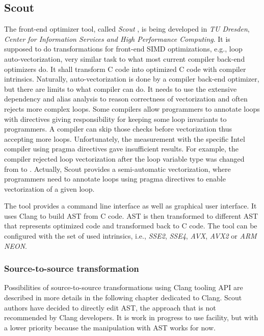 \subsection{Scout}
\label{scout}
The front-end optimizer tool, called \emph{Scout} \cite{scout}, is being developed in \emph{TU Dresden}, \emph{Center for Information Services and High Performance Computing}. It is supposed to do transformations for front-end SIMD optimizations, e.g., loop auto-vectorization, very similar task to what most current compiler back-end optimizers do. It shall transform C code into optimized C code with compiler intrinsics. Naturally, auto-vectorization is done by a compiler back-end optimizer, but there are limits to what compiler can do. It needs to use the extensive dependency and alias analysis to reason correctness of vectorization and often rejects more complex loops. Some compilers allow programmers to annotate loops with  directives giving responsibility for keeping some loop invariants to programmers. A compiler can skip those checks before vectorization thus accepting more loops. Unfortunately, the measurement with the specific Intel compiler using pragma directives gave insufficient results. For example, the compiler rejected loop vectorization after the loop variable type was changed from  to . Actually, Scout provides a semi-automatic vectorization, where programmers need to annotate loops using pragma directives to enable vectorization of a given loop. 

The tool provides a command line interface as well as graphical user interface. It uses Clang to build AST from C code. AST is then transformed to different AST that represents optimized code and transformed back to C code. The tool can be configured with the set of used intrinsics, i.e., \emph{SSE2}, \emph{SSE4}, \emph{AVX}, \emph{AVX2} or \emph{ARM NEON}.

\subsubsection{Source-to-source transformation}
Possibilities of source-to-source transformations using Clang tooling API are described in more details in the following chapter dedicated to Clang. Scout authors have decided to directly edit AST, the approach that is not recommended by Clang developers. It is work in progress to use  facility, but with a lower priority because the manipulation with AST works for now.

